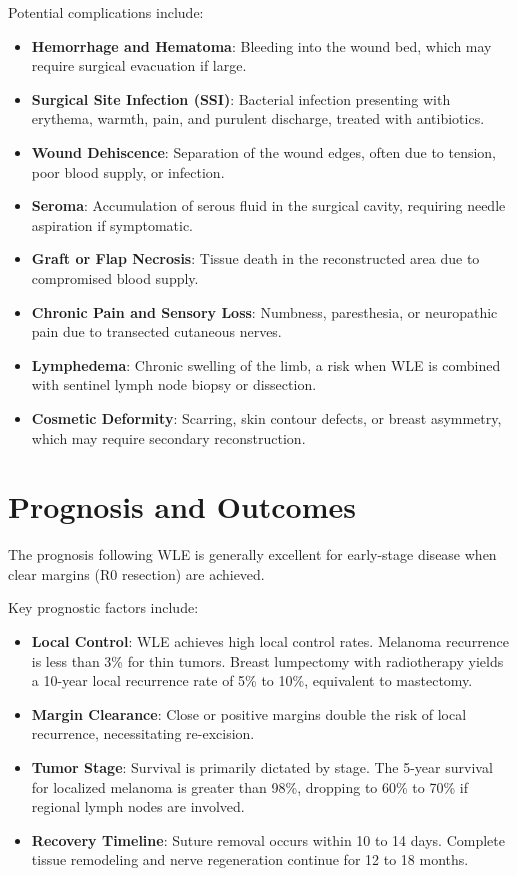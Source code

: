Potential complications include:
\begin{itemize}
    \item \textbf{Hemorrhage and Hematoma}: Bleeding into the wound bed, which may require surgical evacuation if large.
    \item \textbf{Surgical Site Infection (SSI)}: Bacterial infection presenting with erythema, warmth, pain, and purulent discharge, treated with antibiotics.
    \item \textbf{Wound Dehiscence}: Separation of the wound edges, often due to tension, poor blood supply, or infection.
    \item \textbf{Seroma}: Accumulation of serous fluid in the surgical cavity, requiring needle aspiration if symptomatic.
    \item \textbf{Graft or Flap Necrosis}: Tissue death in the reconstructed area due to compromised blood supply.
    \item \textbf{Chronic Pain and Sensory Loss}: Numbness, paresthesia, or neuropathic pain due to transected cutaneous nerves.
    \item \textbf{Lymphedema}: Chronic swelling of the limb, a risk when WLE is combined with sentinel lymph node biopsy or dissection.
    \item \textbf{Cosmetic Deformity}: Scarring, skin contour defects, or breast asymmetry, which may require secondary reconstruction.
\end{itemize}

\section*{Prognosis and Outcomes}
The prognosis following WLE is generally excellent for early-stage disease when clear margins (R0 resection) are achieved.

Key prognostic factors include:
\begin{itemize}
    \item \textbf{Local Control}: WLE achieves high local control rates. Melanoma recurrence is less than 3\% for thin tumors. Breast lumpectomy with radiotherapy yields a 10-year local recurrence rate of 5\% to 10\%, equivalent to mastectomy.
    \item \textbf{Margin Clearance}: Close or positive margins double the risk of local recurrence, necessitating re-excision.
    \item \textbf{Tumor Stage}: Survival is primarily dictated by stage. The 5-year survival for localized melanoma is greater than 98\%, dropping to 60\% to 70\% if regional lymph nodes are involved.
    \item \textbf{Recovery Timeline}: Suture removal occurs within 10 to 14 days. Complete tissue remodeling and nerve regeneration continue for 12 to 18 months.
\end{itemize}

